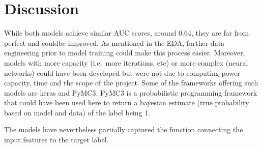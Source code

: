 \documentclass{article}
\begin{document}
    \section{Discussion}\label{discussion}

While both models achieve similar AUC scores, around 0.64, they are far
from perfect and couldbe improved. As mentioned in the EDA, further data
engineering prior to model training could make this process easier.
Moreover, models with more capacity (i.e.~more iterations, etc) or more
complex (neural networks) could have been developed but were not due to
computing power capacity, time and the scope of the project. Some of the
frameworks offering such models are keras and PyMC3. PyMC3 is a
probabilistic programming framework that could have been used here to
return a bayesian estimate (true probability based on model and data) of
the label being 1.

The models have nevertheless partially captured the function connecting
the input features to the target label.


    
    
    
    
\end{document}
